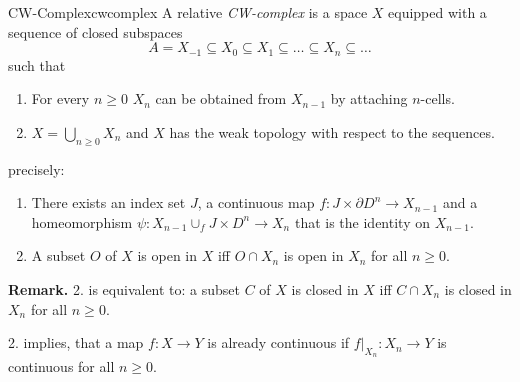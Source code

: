 \documentclass{TemplateLecture}
\begin{document}
\begin{defi}{CW-Complex}{cwcomplex}
    A relative \emph{CW-complex} is a space \(X\) equipped with a sequence of closed subspaces
    \[A = X_{-1} \subseteq X_0 \subseteq X_1 \subseteq \dots \subseteq X_n \subseteq \dots \]
    such that
    \begin{enumerate}
        \item For every \(n \geq 0\) \(X_n\) can be obtained from \(X_{n-1}\) by attaching \(n\)-cells.
        \item \(X = \bigcup_{n \geq 0} X_n\) and \(X\) has the weak topology with respect to the sequences.
    \end{enumerate}

    precisely:
    \begin{enumerate}
        \item There exists an index set \(J\), a continuous map \(f \colon J \times \partial D^n \to X_{n-1}\) and a homeomorphism \(\psi\colon X_{n-1} \cup_f J\times D^n \to X_n\) that is the identity on \(X_{n-1}\).
        \item A subset \(O\) of \(X\) is open in \(X\) iff \(O\cap X_n\) is open in \(X_n\) for all \(n \geq 0\).
    \end{enumerate}
\end{defi}

    \textbf{Remark.} 2. is equivalent to: a subset \(C\) of \(X\) is closed in \(X\) iff \(C\cap X_n\) is closed in \(X_n\) for all \(n \geq 0\).

    2. implies, that a map \(f\colon X\to Y\) is already continuous if \(f\rvert_{X_n}\colon X_n \to Y\) is continuous for all \(n \geq 0\).
\end{document}
